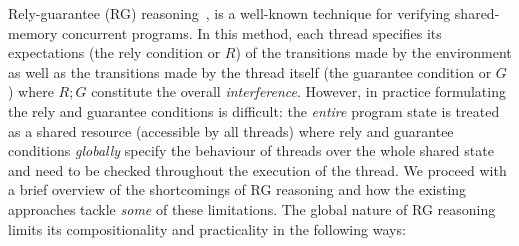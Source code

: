 Rely-guarantee (RG) reasoning~\cite{rg}, is a well-known technique for verifying shared-memory concurrent programs. In this method, each thread specifies its expectations (the rely condition or $R$) of the transitions made by the environment as well as the transitions made by the thread itself (the guarantee condition or $G$) where $R;G$ constitute the overall \emph{interference}. However, in practice formulating the rely and guarantee conditions is difficult: the \emph{entire} program state is treated as a shared resource (accessible by all threads) where rely and guarantee conditions \emph{globally} specify the behaviour of threads over the whole shared state and need to be checked throughout the execution of the thread. We proceed with a brief overview of the shortcomings of RG reasoning and how the existing approaches tackle \emph{some} of these limitations. 
%
The global nature of RG reasoning limits its compositionality and practicality in the following ways:\vspace{-3pt}
%
